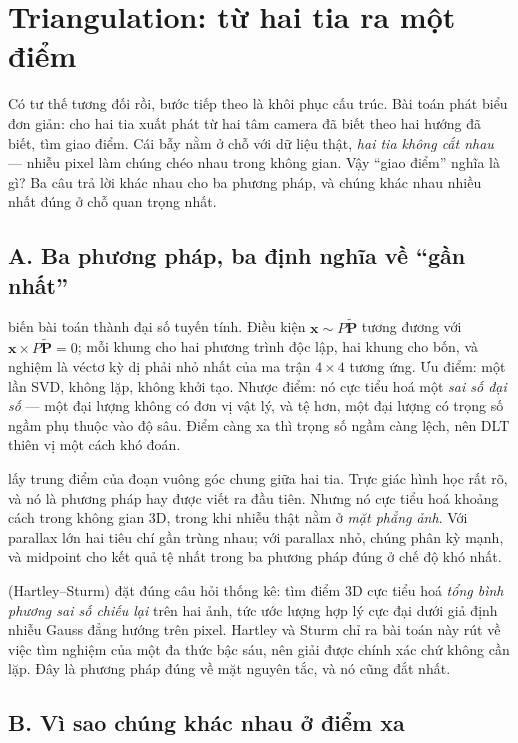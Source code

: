 \documentclass[../../vslam.tex]{subfiles}
\begin{document}
\section{Triangulation: từ hai tia ra một điểm}

Có tư thế tương đối rồi, bước tiếp theo là khôi phục cấu trúc. Bài toán phát biểu đơn giản: cho hai tia xuất phát từ hai tâm camera đã biết theo hai hướng đã biết, tìm giao điểm. Cái bẫy nằm ở chỗ với dữ liệu thật, \emph{hai tia không cắt nhau} --- nhiễu pixel làm chúng chéo nhau trong không gian. Vậy ``giao điểm'' nghĩa là gì? Ba câu trả lời khác nhau cho ba phương pháp, và chúng khác nhau nhiều nhất đúng ở chỗ quan trọng nhất.

\subsection{A. Ba phương pháp, ba định nghĩa về ``gần nhất''}

 biến bài toán thành đại số tuyến tính. Điều kiện \(\mathbf{x} \sim P\tilde{\mathbf{P}}\) tương đương với \(\mathbf{x} \times P\tilde{\mathbf{P}} = 0\); mỗi khung cho hai phương trình độc lập, hai khung cho bốn, và nghiệm là véctơ kỳ dị phải nhỏ nhất của ma trận \(4\times 4\) tương ứng. Ưu điểm: một lần SVD, không lặp, không khởi tạo. Nhược điểm: nó cực tiểu hoá một \emph{sai số đại số} --- một đại lượng không có đơn vị vật lý, và tệ hơn, một đại lượng có trọng số ngầm phụ thuộc vào độ sâu. Điểm càng xa thì trọng số ngầm càng lệch, nên DLT thiên vị một cách khó đoán.

 lấy trung điểm của đoạn vuông góc chung giữa hai tia. Trực giác hình học rất rõ, và nó là phương pháp hay được viết ra đầu tiên. Nhưng nó cực tiểu hoá khoảng cách trong không gian \(3\)D, trong khi nhiễu thật nằm ở \emph{mặt phẳng ảnh}. Với parallax lớn hai tiêu chí gần trùng nhau; với parallax nhỏ, chúng phân kỳ mạnh, và midpoint cho kết quả tệ nhất trong ba phương pháp đúng ở chế độ khó nhất.

 (Hartley--Sturm) đặt đúng câu hỏi thống kê: tìm điểm \(3\)D cực tiểu hoá \emph{tổng bình phương sai số chiếu lại} trên hai ảnh, tức ước lượng hợp lý cực đại dưới giả định nhiễu Gauss đẳng hướng trên pixel. Hartley và Sturm \cite{hartley1997triangulation} chỉ ra bài toán này rút về việc tìm nghiệm của một đa thức bậc sáu, nên giải được chính xác chứ không cần lặp. Đây là phương pháp đúng về mặt nguyên tắc, và nó cũng đắt nhất.

\subsection{B. Vì sao chúng khác nhau ở điểm xa}
\end{document}
